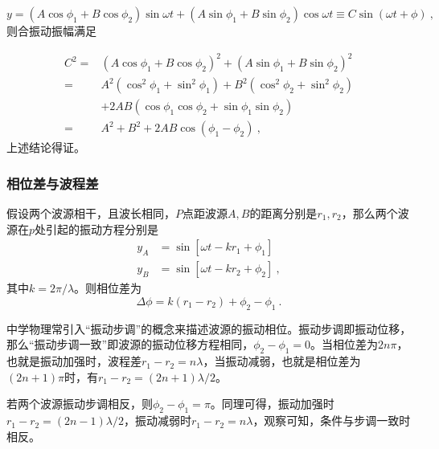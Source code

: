 \begin{equation}
y=\left(A \cos \phi_1+B \cos \phi_2\right) \sin \omega t+\left(A \sin \phi_1+B \sin \phi_2\right) \cos \omega t\equiv C\sin (\omega t+\phi)~,
\end{equation}
则合振动振幅满足

\begin{equation}
\begin{aligned}
C^2
= & \left(A \cos \phi_1+B \cos \phi_2\right)^2+\left(A \sin \phi_1+B \sin \phi_2\right)^2 \\
= & A^2\left(\cos ^2 \phi_1+\sin ^2 \phi_1\right)+B^2\left(\cos ^2 \phi_2+\sin ^2 \phi_2\right) \\
& +2 A B\left(\cos \phi_1 \cos \phi_2+\sin \phi_1 \sin \phi_2\right) \\
= & A^2+B^2+2 A B \cos \left(\phi_1-\phi_2\right)~,
\end{aligned}
\end{equation}
上述结论得证。
\subsubsection{相位差与波程差}
假设两个波源相干，且波长相同，$P$点距波源$A,B$的距离分别是$r_1,r_2$，那么两个波源在$p$处引起的振动方程分别是
\begin{equation}
\begin{aligned}
y_A&=\sin[\omega t-kr_1+\phi_1]\\
y_B&=\sin[\omega t-kr_2+\phi_2]~,
\end{aligned}
\end{equation}
其中$k=2\pi/\lambda$。则相位差为
\begin{equation}
\Delta\phi=k(r_1-r_2)+\phi_2-\phi_1~.
\end{equation}

中学物理常引入“振动步调”的概念来描述波源的振动相位。振动步调即振动位移，那么“振动步调一致”即波源的振动位移方程相同，$\phi_2-\phi_1=0$。当相位差为$2n\pi$，也就是振动加强时，波程差$r_1-r_2=n\lambda$，当振动减弱，也就是相位差为$(2n+1)\pi$时，有$r_1-r_2=(2n+1)\lambda/2$。

若两个波源振动步调相反，则$\phi_2-\phi_1=\pi$。同理可得，振动加强时$r_1-r_2=(2n-1)\lambda/2$，振动减弱时$r_1-r_2=n\lambda$，观察可知，条件与步调一致时相反。



